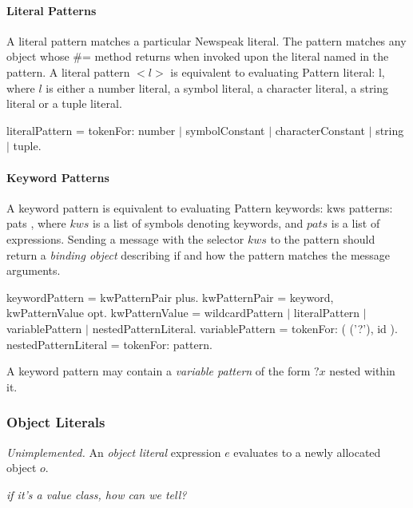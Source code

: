 \documentclass{article}
\newcommand{\code}[1]{{\sf #1}}
\begin{document}
\paragraph{Literal Patterns}
\label{literalPattern}

A literal pattern matches a particular Newspeak literal. The pattern matches any object whose \#= method returns \TRUE{} when invoked upon the literal named in the pattern. A literal pattern $<l>$  is equivalent to evaluating \code{Pattern literal: l}, where $l$ is either a number literal, a symbol literal, a character literal, a string literal or a tuple literal. 

\begin{newspeak}
literalPattern = tokenFor: number $|$ symbolConstant $|$ characterConstant $|$ string $|$ tuple.
\end{newspeak}

\paragraph{Keyword Patterns}
\label{keywordPattern}

A keyword pattern is equivalent to evaluating \code{Pattern keywords: kws patterns: pats }, where $kws$ is a list of symbols denoting keywords, and $pats$ is a list of expressions.  Sending a message with the selector $kws$ to the pattern should return a {\em binding object} describing if and how the pattern matches the message arguments.

\begin{newspeak}
keywordPattern = kwPatternPair plus. 
kwPatternPair = keyword, kwPatternValue opt. 
kwPatternValue = wildcardPattern $|$ literalPattern $|$ variablePattern $|$ nestedPatternLiteral. 
variablePattern = tokenFor: ( ('?'), id ). 
nestedPatternLiteral = tokenFor: pattern.
\end{newspeak}


A keyword pattern may contain a {\em variable pattern} of the form $?x$ nested within it. 

\subsubsection{Object Literals}
\label{objLiteral}

{\it Unimplemented.}
An {\em object literal} expression $e$ evaluates to a newly allocated object $o$. 

{\it if it's a value class, how can we tell?}
\end{document}
